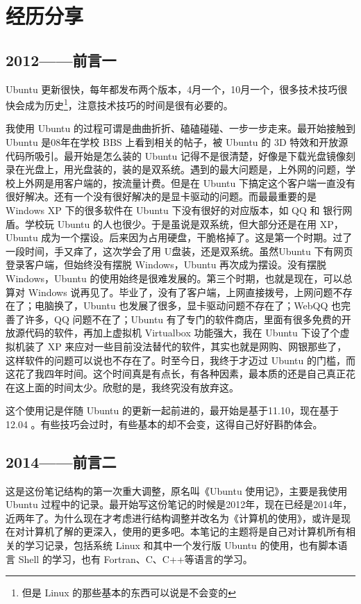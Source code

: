 \documentclass[cn,11pt,chinese,twoside]{elegantbook}
\begin{document}
\section*{经历分享}
\subsection*{2012——前言一}
    Ubuntu 更新很快，每年都发布两个版本，4月一个，10月一个，很多技术技巧很快会成为历史\footnote{但是 Linux 的那些基本的东西可以说是不会变的}，注意技术技巧的时间是很有必要的。

    我使用 Ubuntu 的过程可谓是曲曲折折、磕磕碰碰、一步一步走来。最开始接触到 Ubuntu 是08年在学校 BBS 上看到相关的帖子，被 Ubuntu 的 3D 特效和开放源代码所吸引。最开始是怎么装的 Ubuntu 记得不是很清楚，好像是下载光盘镜像刻录在光盘上，用光盘装的，装的是双系统。遇到的最大问题是，上外网的问题，学校上外网是用客户端的，按流量计费。但是在 Ubuntu 下搞定这个客户端一直没有很好解决。还有一个没有很好解决的是显卡驱动的问题。而最最重要的是 Windows  XP 下的很多软件在 Ubuntu 下没有很好的对应版本，如 QQ 和 银行网盾。学校玩 Ubuntu 的人也很少。于是虽说是双系统，但大部分还是在用 XP， Ubuntu 成为一个摆设。后来因为占用硬盘，干脆格掉了。这是第一个时期。过了一段时间，手又痒了，这次学会了用 U盘装，还是双系统。虽然Ubuntu 下有网页登录客户端，但始终没有摆脱 Windows，Ubuntu 再次成为摆设。没有摆脱Windows，Ubuntu 的使用始终是很难发展的。第三个时期，也就是现在，可以总算对 Windows 说再见了。毕业了，没有了客户端，上网直接拨号，上网问题不存在了；电脑换了，Ubuntu 也发展了很多，显卡驱动问题不存在了；WebQQ 也完善了许多，QQ 问题不在了；Ubuntu 有了专门的软件商店，里面有很多免费的开放源代码的软件，再加上虚拟机 Virtualbox 功能强大，我在 Ubuntu 下设了个虚拟机装了 XP 来应对一些目前没法替代的软件，其实也就是网购、网银那些了，这样软件的问题可以说也不存在了。时至今日，我终于才迈过 Ubuntu 的门槛，而这花了我四年时间。这个时间真是有点长，有各种因素，最本质的还是自己真正花在这上面的时间太少。欣慰的是，我终究没有放弃这。
    
 这个使用记是伴随 Ubuntu 的更新一起前进的，最开始是基于11.10，现在基于12.04 。有些技巧会过时，有些基本的却不会变，这得自己好好斟酌体会。
 



\subsection*{2014——前言二}
这是这份笔记结构的第一次重大调整，原名叫《Ubuntu 使用记》，主要是我使用 Ubuntu 过程中的记录。最开始写这份笔记的时候是2012年，现在已经是2014年，近两年了。为什么现在才考虑进行结构调整并改名为《计算机的使用》，或许是现在对计算机了解的更深入，使用的更多吧。本笔记的主题将是自己对计算机所有相关的学习记录，包括系统 Linux 和其中一个发行版 Ubuntu 的使用，也有脚本语言 Shell 的学习，也有 Fortran、C、C++等语言的学习。
\end{document}
